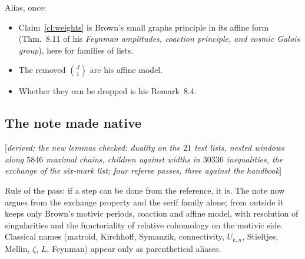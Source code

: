 \documentclass[11pt]{article}
\newcommand{\status}[1]{\hfill{\small[\textit{#1}]}}
\theoremstyle{plain}
\theoremstyle{remark}
\begin{document}
Alias, once:
\begin{itemize}
\item Claim~\ref{cl:weights} is Brown's small graphs principle in its affine form (Thm.~8.11 of his \emph{Feynman amplitudes, coaction principle, and cosmic Galois group}), here for families of lists.
\item The removed $\binom J1$ are his affine model.
\item Whether they can be dropped is his Remark~8.4.
\end{itemize}


\subsection{The note made native}\status{derived; the new lemmas checked: duality on the $21$ test lists, nested windows along $5846$ maximal chains, children against widths in $30336$ inequalities, the exchange of the six-mark list; four referee passes, three against the handbook}

Rule of the pass: if a step can be done from the reference, it is. The note now argues from the exchange property and the serif family alone; from outside it keeps only Brown's motivic periods, coaction and affine model, with resolution of singularities and the functoriality of relative cohomology on the motivic side. Classical names (matroid, Kirchhoff, Symanzik, connectivity, $U_{k,n}$, Stieltjes, Mellin, $\zeta$, $L$, Feynman) appear only as parenthetical aliases.
\end{document}

